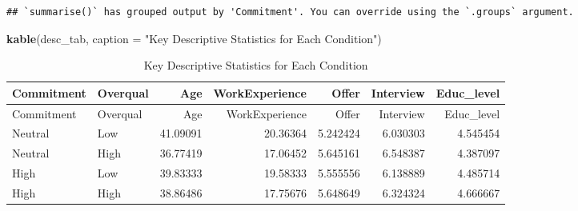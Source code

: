 \documentclass[]{article}
\newenvironment{Shaded}{\begin{snugshade}}{\end{snugshade}}
\newcommand{\DataTypeTok}[1]{\textcolor[rgb]{0.13,0.29,0.53}{#1}}
\newcommand{\KeywordTok}[1]{\textcolor[rgb]{0.13,0.29,0.53}{\textbf{#1}}}
\newcommand{\NormalTok}[1]{#1}
\newcommand{\OperatorTok}[1]{\textcolor[rgb]{0.81,0.36,0.00}{\textbf{#1}}}
\newcommand{\StringTok}[1]{\textcolor[rgb]{0.31,0.60,0.02}{#1}}
\begin{document}
\begin{Shaded}
\end{Shaded}

\begin{verbatim}
## `summarise()` has grouped output by 'Commitment'. You can override using the `.groups` argument.
\end{verbatim}

\begin{Shaded}
\begin{Highlighting}[]
\KeywordTok{kable}\NormalTok{(desc_tab, }\DataTypeTok{caption =} \StringTok{"Key Descriptive Statistics for Each Condition"}\NormalTok{)}
\end{Highlighting}
\end{Shaded}

\begin{longtable}[]{@{}llrrrrr@{}}
\caption{Key Descriptive Statistics for Each Condition}\tabularnewline
\toprule
Commitment & Overqual & Age & WorkExperience & Offer & Interview &
Educ\_level\tabularnewline
\midrule
\endfirsthead
\toprule
Commitment & Overqual & Age & WorkExperience & Offer & Interview &
Educ\_level\tabularnewline
\midrule
\endhead
Neutral & Low & 41.09091 & 20.36364 & 5.242424 & 6.030303 &
4.545454\tabularnewline
Neutral & High & 36.77419 & 17.06452 & 5.645161 & 6.548387 &
4.387097\tabularnewline
High & Low & 39.83333 & 19.58333 & 5.555556 & 6.138889 &
4.485714\tabularnewline
High & High & 38.86486 & 17.75676 & 5.648649 & 6.324324 &
4.666667\tabularnewline
\bottomrule
\end{longtable}

\begin{Shaded}
\end{Shaded}
\end{document}
